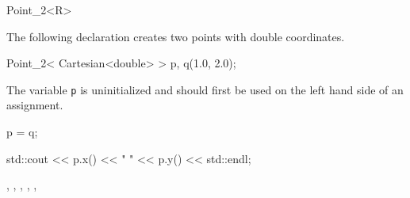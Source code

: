 \begin{ccRefClass} {Point_2<R>}
\ccExample

The following declaration creates two points with  double coordinates.

\begin{cprog}

  Point_2< Cartesian<double> > p, q(1.0, 2.0);
\end{cprog} 

The variable {\tt p} is uninitialized and should first be used on 
the left hand side of an assignment. 
\begin{cprog}

  p = q;

  std::cout << p.x() << "  " << p.y() << std::endl; 
\end{cprog} 

\ccSeeAlso

, , , , , 

\end{ccRefClass} 
